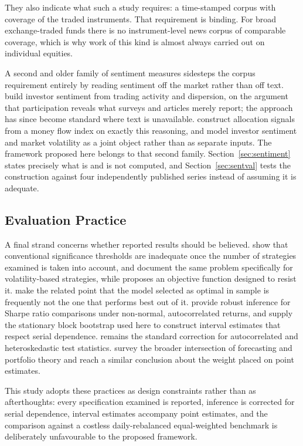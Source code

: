 \documentclass{singlecol-new}
\theoremstyle{TH}{
\newtheorem{lemma}{Lemma}
\newtheorem{theorem}[lemma]{Theorem}
\newtheorem{corrolary}[lemma]{Corrolary}
\newtheorem{conjecture}[lemma]{Conjecture}
\newtheorem{proposition}[lemma]{Proposition}
\newtheorem{claim}[lemma]{Claim}
\newtheorem{stheorem}[lemma]{Wrong Theorem}
\newtheorem{algorithm}{Algorithm}
}
\theoremstyle{THrm}{
\newtheorem{definition}{Definition}[section]
\newtheorem{question}{Question}[section]
\newtheorem{remark}{Remark}
\newtheorem{scheme}{Scheme}
}
\theoremstyle{THhit}{
\newtheorem{case}{Case}[section]
}
\begin{document}
They also indicate what such a study requires: a time-stamped corpus with coverage of
the traded instruments. That requirement is binding. For broad exchange-traded funds
there is no instrument-level news corpus of comparable coverage, which is why work of
this kind is almost always carried out on individual equities.

A second and older family of sentiment measures sidesteps the corpus requirement
entirely by reading sentiment off the market rather than off text. \citet{bakerwurgler07}
build investor sentiment from trading activity and dispersion, on the argument that
participation reveals what surveys and articles merely report; the approach has since
become standard where text is unavailable. \citet{singsiri26} construct allocation
signals from a money flow index on exactly this reasoning, and \citet{naidoo25} model
investor sentiment and market volatility as a joint object rather than as separate
inputs. The framework proposed here belongs to that second family.
Section~\ref{sec:sentiment} states precisely what is and is not computed, and
Section~\ref{sec:sentval} tests the construction against four independently published
series instead of assuming it is adequate.

\subsection{Evaluation Practice}

A final strand concerns whether reported results should be believed.
\citet{harvey15} show that conventional significance thresholds are inadequate once the
number of strategies examined is taken into account, and \citet{valls26} document the
same problem specifically for volatility-based strategies, while \citet{sheppert26}
proposes an objective function designed to resist it. \citet{zhangz25} make the related
point that the model selected as optimal in sample is frequently not the one that
performs best out of it. \citet{ledoit08} provide
robust inference for Sharpe ratio comparisons under non-normal, autocorrelated returns,
and \citet{politis94} supply the stationary block bootstrap used here to construct
interval estimates that respect serial dependence. \citet{newey87} remains the standard
correction for autocorrelated and heteroskedastic test statistics.
\citet{raimundo26} survey the broader intersection of forecasting and portfolio theory
and reach a similar conclusion about the weight placed on point estimates.

This study adopts these practices as design constraints rather than as afterthoughts:
every specification examined is reported, inference is corrected for serial dependence,
interval estimates accompany point estimates, and the comparison against a costless
daily-rebalanced equal-weighted benchmark is deliberately unfavourable to the proposed
framework.
\end{document}
